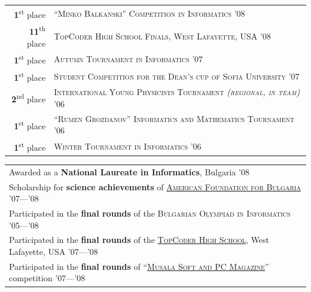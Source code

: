 \documentclass[a4paper,10pt]{article}
\def\myline{\color{linegray}\vline}
\newcommand{\minorcolor}[1]{\textcolor{mygray}{#1}}
\newcommand{\bracketcomment}[1]{{\small\textit{\minorcolor{(#1)}}}}
\begin{document}
{{\vspace{-3mm}\hspace{3.5mm}\begin{tabular}{r!{\myline}p{14cm}}
        \textbf{1}\textsuperscript{st} place    &  \textsc{``Minko Balkanski'' Competition in Informatics '08}\\
        \textbf{11}\textsuperscript{th} place   &  \textsc{TopCoder High School Finals, West Lafayette, USA '08}\\
        \textbf{1}\textsuperscript{st} place    &  \textsc{Autumn Tournament in Informatics '07}\\
        \textbf{1}\textsuperscript{st} place    &  \textsc{Student Competition for the Dean's cup of Sofia University '07}\\
        \textbf{2}\textsuperscript{nd} place    &  \textsc{International Young Physicists Tournament \bracketcomment{regional, in team} '06}\\
        \textbf{1}\textsuperscript{st} place    &  \textsc{``Rumen Grozdanov'' Informatics and Mathematics Tournament '06}\\
        \textbf{1}\textsuperscript{st} place    &  \textsc{Winter Tournament in Informatics '06}\\
\end{tabular}
\medskip

\hspace{3mm}\begin{tabular}{@{•\enskip}p{14.5cm}}
        Awarded as a \textbf{National Laureate in Informatics}, Bulgaria \textsc{'08}\\
        Scholarship for \textbf{science achievements} of \href{http://www.afbulgaria.org/}{\textsc{American Foundation for Bulgaria}} \textsc{'07}---\textsc{'08}\\
        Participated in the \textbf{final rounds} of the \textsc{Bulgarian Olympiad in Informatics} \textsc{'05}---\textsc{'08}\\
        Participated in the \textbf{final rounds} of the \href{http://community.topcoder.com/tc?module=Static\&d1=tournaments\&d2=home}{\textsc{TopCoder High School}}, West Lafayette, USA \textsc{'07}---\textsc{'08}\\
        Participated in the \textbf{final rounds} of ``\href{http://konkurs.musala.com/}{\textsc{Musala Soft and PC Magazine}}'' competition \textsc{'07}---\textsc{'08}\\
\end{tabular}
}  %

}
\end{document}
